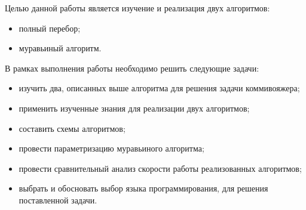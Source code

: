 Целью данной работы является изучение и реализация двух алгоритмов:
\begin{itemize}
	\item полный перебор;
	\item муравьиный алгоритм.
\end{itemize}

В рамках выполнения работы необходимо решить следующие задачи:

\begin{itemize}
	\item изучить два, описанных выше алгоритма для решения задачи коммивояжера;
	\item применить изученные знания для реализации двух алгоритмов;
	\item составить схемы алгоритмов;
	\item провести параметризацию муравьиного алгоритма;
	\item провести сравнительный анализ скорости работы реализованных алгоритмов;
	\item выбрать и обосновать выбор языка программирования, для решения поставленной задачи.
\end{itemize}